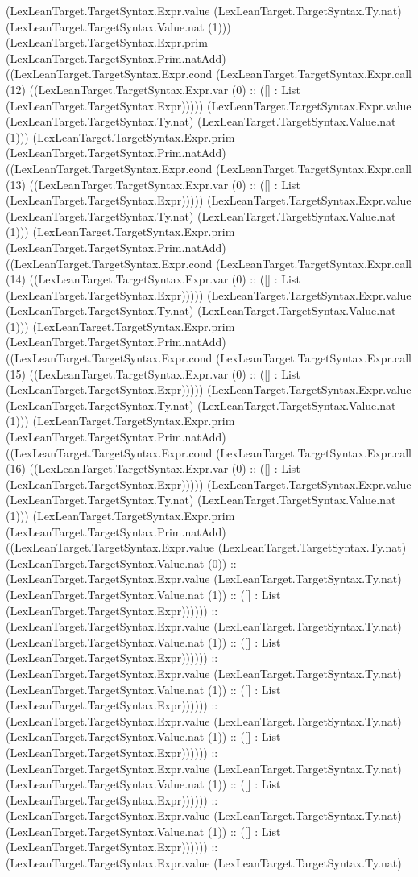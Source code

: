 \documentclass[11pt]{article}
\begin{document}
(LexLeanTarget.TargetSyntax.Expr.value (LexLeanTarget.TargetSyntax.Ty.nat) (LexLeanTarget.TargetSyntax.Value.nat (1))) (LexLeanTarget.TargetSyntax.Expr.prim (LexLeanTarget.TargetSyntax.Prim.natAdd) ((LexLeanTarget.TargetSyntax.Expr.cond (LexLeanTarget.TargetSyntax.Expr.call (12) ((LexLeanTarget.TargetSyntax.Expr.var (0) :: ([] : List (LexLeanTarget.TargetSyntax.Expr))))) (LexLeanTarget.TargetSyntax.Expr.value (LexLeanTarget.TargetSyntax.Ty.nat) (LexLeanTarget.TargetSyntax.Value.nat (1))) (LexLeanTarget.TargetSyntax.Expr.prim (LexLeanTarget.TargetSyntax.Prim.natAdd) ((LexLeanTarget.TargetSyntax.Expr.cond (LexLeanTarget.TargetSyntax.Expr.call (13) ((LexLeanTarget.TargetSyntax.Expr.var (0) :: ([] : List (LexLeanTarget.TargetSyntax.Expr))))) (LexLeanTarget.TargetSyntax.Expr.value (LexLeanTarget.TargetSyntax.Ty.nat) (LexLeanTarget.TargetSyntax.Value.nat (1))) (LexLeanTarget.TargetSyntax.Expr.prim (LexLeanTarget.TargetSyntax.Prim.natAdd) ((LexLeanTarget.TargetSyntax.Expr.cond (LexLeanTarget.TargetSyntax.Expr.call (14) ((LexLeanTarget.TargetSyntax.Expr.var (0) :: ([] : List (LexLeanTarget.TargetSyntax.Expr))))) (LexLeanTarget.TargetSyntax.Expr.value (LexLeanTarget.TargetSyntax.Ty.nat) (LexLeanTarget.TargetSyntax.Value.nat (1))) (LexLeanTarget.TargetSyntax.Expr.prim (LexLeanTarget.TargetSyntax.Prim.natAdd) ((LexLeanTarget.TargetSyntax.Expr.cond (LexLeanTarget.TargetSyntax.Expr.call (15) ((LexLeanTarget.TargetSyntax.Expr.var (0) :: ([] : List (LexLeanTarget.TargetSyntax.Expr))))) (LexLeanTarget.TargetSyntax.Expr.value (LexLeanTarget.TargetSyntax.Ty.nat) (LexLeanTarget.TargetSyntax.Value.nat (1))) (LexLeanTarget.TargetSyntax.Expr.prim (LexLeanTarget.TargetSyntax.Prim.natAdd) ((LexLeanTarget.TargetSyntax.Expr.cond (LexLeanTarget.TargetSyntax.Expr.call (16) ((LexLeanTarget.TargetSyntax.Expr.var (0) :: ([] : List (LexLeanTarget.TargetSyntax.Expr))))) (LexLeanTarget.TargetSyntax.Expr.value (LexLeanTarget.TargetSyntax.Ty.nat) (LexLeanTarget.TargetSyntax.Value.nat (1))) (LexLeanTarget.TargetSyntax.Expr.prim (LexLeanTarget.TargetSyntax.Prim.natAdd) ((LexLeanTarget.TargetSyntax.Expr.value (LexLeanTarget.TargetSyntax.Ty.nat) (LexLeanTarget.TargetSyntax.Value.nat (0)) :: (LexLeanTarget.TargetSyntax.Expr.value (LexLeanTarget.TargetSyntax.Ty.nat) (LexLeanTarget.TargetSyntax.Value.nat (1)) :: ([] : List (LexLeanTarget.TargetSyntax.Expr)))))) :: (LexLeanTarget.TargetSyntax.Expr.value (LexLeanTarget.TargetSyntax.Ty.nat) (LexLeanTarget.TargetSyntax.Value.nat (1)) :: ([] : List (LexLeanTarget.TargetSyntax.Expr)))))) :: (LexLeanTarget.TargetSyntax.Expr.value (LexLeanTarget.TargetSyntax.Ty.nat) (LexLeanTarget.TargetSyntax.Value.nat (1)) :: ([] : List (LexLeanTarget.TargetSyntax.Expr)))))) :: (LexLeanTarget.TargetSyntax.Expr.value (LexLeanTarget.TargetSyntax.Ty.nat) (LexLeanTarget.TargetSyntax.Value.nat (1)) :: ([] : List (LexLeanTarget.TargetSyntax.Expr)))))) :: (LexLeanTarget.TargetSyntax.Expr.value (LexLeanTarget.TargetSyntax.Ty.nat) (LexLeanTarget.TargetSyntax.Value.nat (1)) :: ([] : List (LexLeanTarget.TargetSyntax.Expr)))))) :: (LexLeanTarget.TargetSyntax.Expr.value (LexLeanTarget.TargetSyntax.Ty.nat) (LexLeanTarget.TargetSyntax.Value.nat (1)) :: ([] : List (LexLeanTarget.TargetSyntax.Expr)))))) :: (LexLeanTarget.TargetSyntax.Expr.value (LexLeanTarget.TargetSyntax.Ty.nat) 
\end{document}
